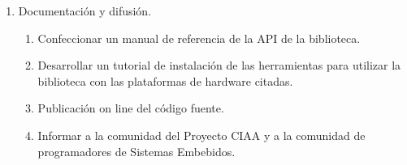 \begin{enumerate}
   \item Documentación y difusión.
      \begin{enumerate}[1]
         \item Confeccionar un manual de referencia de la API de la biblioteca.
         \item Desarrollar un tutorial de instalación de las herramientas para utilizar la biblioteca con las plataformas de hardware citadas.
         \item Publicación on line del código fuente.
         \item Informar a la comunidad del Proyecto CIAA y a la comunidad de programadores de
   Sistemas Embebidos.
      \end{enumerate}
\end{enumerate}

% 
% 

